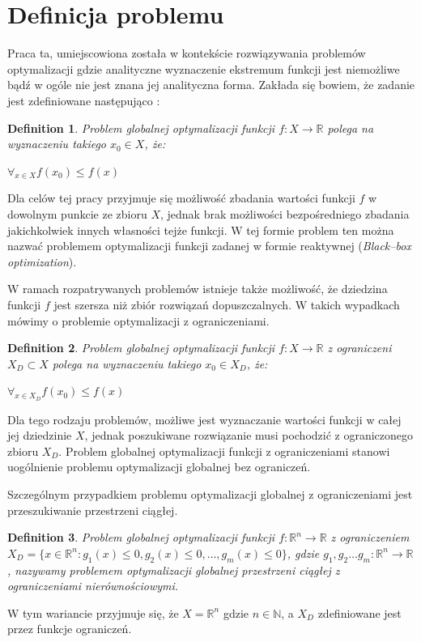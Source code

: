 \documentclass[12pt,a4paper]{report}
\begin{document}
\section{Definicja problemu}
\par{
Praca ta, umiejscowiona została w kontekście rozwiązywania problemów optymalizacji gdzie analityczne wyznaczenie ekstremum funkcji jest niemożliwe bądź w ogóle nie jest znana jej analityczna forma. Zakłada się bowiem, że zadanie jest zdefiniowane następująco \cite{StrojnowskiOptymalizacja2}:
}
\newtheorem{OptDefinition}{Definition}
\par{
\begin{OptDefinition}
Problem globalnej optymalizacji funkcji $f: X \rightarrow \mathbb{R}$ polega na wyznaczeniu takiego $x_0 \in X$, że:
\begin{center}
	$\forall_{x \in X} f(x_0) \leq f(x)$
\end{center}
\end{OptDefinition}
\par{
Dla celów tej pracy przyjmuje się możliwość zbadania wartości funkcji $f$ w dowolnym punkcie ze zbioru $X$, jednak brak możliwości bezpośredniego zbadania jakichkolwiek innych własności tejże funkcji. W tej formie problem ten można nazwać problemem optymalizacji funkcji zadanej w formie reaktywnej (\emph{Black--box optimization}).
}
\par{
W ramach rozpatrywanych problemów istnieje także możliwość, że dziedzina funkcji $f$ jest szersza niż zbiór rozwiązań dopuszczalnych. W takich wypadkach mówimy o problemie optymalizacji z ograniczeniami.
\begin{OptDefinition}
Problem globalnej optymalizacji funkcji $f: X \rightarrow \mathbb{R}$ z ograniczeni $X_D \subset X$ polega na wyznaczeniu takiego $x_0 \in X_D$, że:
\begin{center}
	$\forall_{x \in X_D} f(x_0) \leq f(x)$
\end{center}
\end{OptDefinition}
Dla tego rodzaju problemów, możliwe jest wyznaczanie wartości funkcji w całej jej dziedzinie $X$, jednak poszukiwane rozwiązanie musi pochodzić z ograniczonego zbioru $X_D$.
Problem globalnej optymalizacji funkcji z ograniczeniami stanowi uogólnienie problemu optymalizacji globalnej bez ograniczeń.
}
\par{
Szczególnym przypadkiem problemu optymalizacji globalnej z ograniczeniami jest przeszukiwanie przestrzeni ciągłej. 
\begin{OptDefinition}
Problem globalnej optymalizacji funkcji $f: \mathbb{R}^n \rightarrow \mathbb{R}$ z ograniczeniem $X_D = \{x \in \mathbb{R}^n: g_1(x) \leq 0, g_2(x) \leq 0, \ldots, g_m(x) \leq 0\}$, gdzie $g_1, g_2 \ldots g_m: \mathbb{R}^n \rightarrow \mathbb{R}$, nazywamy problemem optymalizacji globalnej przestrzeni ciągłej z ograniczeniami nierównościowymi.
\end{OptDefinition}
W tym wariancie przyjmuje się, że $X = \mathbb{R}^n$ gdzie $n \in \mathbb{N}$, a $X_D$ zdefiniowane jest przez funkcje ograniczeń.
}

}
\end{document}
